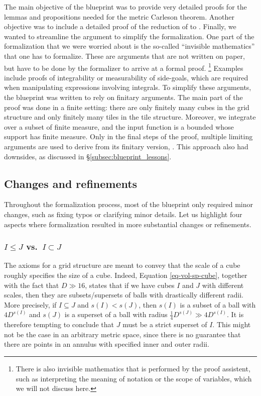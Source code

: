 \documentclass[12pt]{amsart}
\theoremstyle{definition}
\theoremstyle{plain}
\begin{document}
The main objective of the blueprint was to provide very detailed proofs for the lemmas and propositions
needed for the metric Carleson theorem.
Another objective was to include a detailed proof
of the reduction of  to .
Finally, we wanted to streamline the argument to simplify the formalization.
One part of the formalization that we were worried about is the so-called ``invisible mathematics'' \cite{Bauer-2023} that one has to formalize.
These are arguments that are not written on paper,
but have to be done by the formalizer to arrive at a formal proof.%
\footnote{There is also invisible mathematics that is performed by the proof assistent,
such as interpreting the meaning of notation or the scope of variables,
which we will not discuss here.}
Examples include proofs of integrability or measurability of side-goals, which are required
when manipulating expressions involving integrals.
To simplify these arguments, the blueprint was written to rely on finitary arguments.
The main part of the proof was done in a finite setting:
there are only finitely many cubes in the grid structure
and only finitely many tiles in the tile structure.
Moreover, we integrate over a subset of finite measure,
and the input function is a bounded whose support has finite measure.
Only in the final steps of the proof,
multiple limiting arguments are used to derive 
from its finitary version, .
This approach also had downsides, as discussed in \S\ref{subsec:blueprint_lessons}.

\subsection{Changes and refinements}\label{subsec:blueprint_changes}

Throughout the formalization process, most of the blueprint only required minor changes, such as fixing typos or clarifying minor details. Let us highlight four aspects where formalization resulted in more substantial changes or refinements.

\subsubsection{$I \leq J$ vs.\ $I \subset J$}
The axioms for a grid structure are meant to convey that the scale of a cube roughly specifies the size of a cube.
Indeed, Equation \eqref{eq-vol-sp-cube}, together with the fact that $D\gg 16$,
states that if we have cubes $I$ and $J$ with different scales, then they are subsets/supersets of balls with drastically different radii.
More precisely, if $I\subseteq J$ and $s(I)<s(J)$,
then $s(I)$ is a subset of a ball with $4D^{s(I)}$
and $s(J)$ is a superset of a ball with radius $\frac{1}{4}D^{s(J)}\gg 4D^{s(I)}$.
It is therefore tempting to conclude that $J$ must be a strict superset of $I$.
This might not be the case in an arbitrary metric space,
since there is no guarantee that there are points
in an annulus with specified inner and outer radii.
\end{document}
